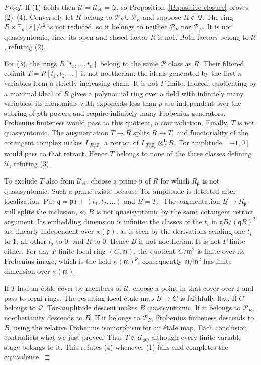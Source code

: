 \begin{proof}
If (1) holds then $\mathcal U=\mathcal U_{\text{ét}}=\mathcal Q$,
so Proposition~\ref{B:positive-closure} proves (2)--(4).
Conversely let $R$ belong to $\mathcal P_F\cup\mathcal P_E$ and
suppose $R\notin\mathcal Q$. The ring
$R\times\mathbb F_p[\epsilon]/\epsilon^2$ is not reduced, so it
belongs to neither $\mathcal P_F$ nor $\mathcal P_E$. It is not
quasisyntomic, since its open and closed factor $R$ is not.
Both factors belong to $\mathcal U$, refuting (2).

For (3), the rings $R[t_1,\ldots,t_n]$ belong to the same
$\mathcal P$ class as $R$. Their filtered colimit
$T=R[t_1,t_2,\ldots]$ is not noetherian: the ideals generated by
the first $n$ variables form a strictly increasing chain.
It is not $F$-finite. Indeed, quotienting by a maximal ideal of
$R$ gives a polynomial ring over a field with infinitely many
variables; its monomials with exponents less than $p$ are
independent over the subring of $p$th powers and require
infinitely many Frobenius generators. Frobenius finiteness would
pass to this quotient, a contradiction.
Finally, $T$ is not quasisyntomic. The augmentation $T\to R$
splits $R\to T$, and functoriality of the cotangent complex makes
$L_{R/\mathbb Z_p}$ a retract of
$L_{T/\mathbb Z_p}\otimes_T^{\mathbf L}R$. Tor amplitude
$[-1,0]$ would pass to that retract. Hence $T$ belongs to none of
the three classes defining $\mathcal U$, refuting (3).

To exclude $T$ also from $\mathcal U_{\text{ét}}$, choose
a prime $\mathfrak p$ of $R$ for which $R_{\mathfrak p}$ is not
quasisyntomic. Such a prime exists because Tor amplitude is
detected after localization. Put
$\mathfrak q=\mathfrak pT+(t_1,t_2,\ldots)$ and $B=T_{\mathfrak q}$.
The augmentation $B\to R_{\mathfrak p}$ still splits the inclusion,
so $B$ is not quasisyntomic by the same cotangent retract argument.
Its embedding dimension is infinite: the classes of the $t_i$ in
$\mathfrak qB/(\mathfrak qB)^2$ are linearly independent over
$\kappa(\mathfrak p)$, as is seen by the derivations sending one
$t_i$ to $1$, all other $t_j$ to $0$, and $R$ to $0$.
Hence $B$ is not noetherian. It is not $F$-finite either. For any
$F$-finite local ring $(C,\mathfrak m)$, the quotient
$C/\mathfrak m^2$ is finite over its Frobenius image, which is the
field $\kappa(\mathfrak m)^p$; consequently
$\mathfrak m/\mathfrak m^2$ has finite dimension over
$\kappa(\mathfrak m)$.

If $T$ had an \'etale cover by members of $\mathcal U$, choose a
point in that cover over $\mathfrak q$ and pass to local rings.
The resulting local \'etale map $B\to C$ is faithfully flat.
If $C$ belongs to $\mathcal Q$, Tor-amplitude descent makes $B$
quasisyntomic. If it belongs to $\mathcal P_E$, noetherianity
descends to $B$. If it belongs to $\mathcal P_F$, Frobenius
finiteness descends to $B$, using the relative Frobenius
isomorphism for an \'etale map. Each conclusion contradicts what
we just proved. Thus $T\notin\mathcal U_{\text{ét}}$,
although every finite-variable stage belongs to it. This refutes
(4) whenever (1) fails and completes the equivalence.
\end{proof}

